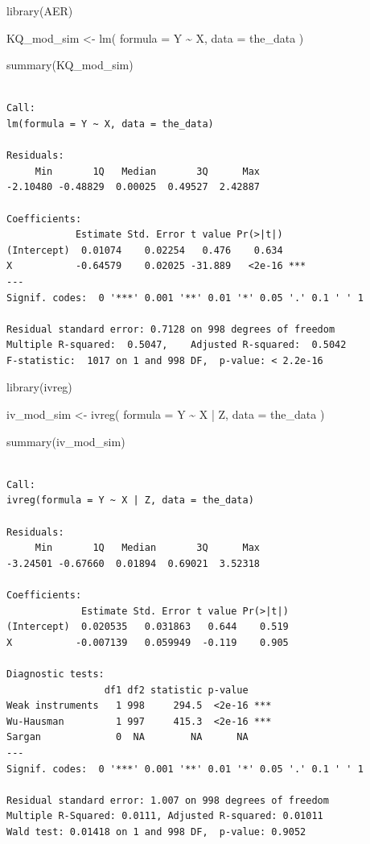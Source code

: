 \documentclass[
  a4paper,
  DIV=11,
  oneside]{scrreprt}
\newenvironment{Shaded}{\begin{snugshade}}{\end{snugshade}}
\newcommand{\AttributeTok}[1]{\textcolor[rgb]{0.40,0.45,0.13}{#1}}
\newcommand{\FunctionTok}[1]{\textcolor[rgb]{0.28,0.35,0.67}{#1}}
\newcommand{\NormalTok}[1]{\textcolor[rgb]{0.00,0.23,0.31}{#1}}
\newcommand{\OtherTok}[1]{\textcolor[rgb]{0.00,0.23,0.31}{#1}}
\newcommand{\SpecialCharTok}[1]{\textcolor[rgb]{0.37,0.37,0.37}{#1}}
\begin{document}
\begin{Shaded}
\begin{Highlighting}[]
\FunctionTok{library}\NormalTok{(AER)}

\NormalTok{KQ\_mod\_sim }\OtherTok{\textless{}{-}} \FunctionTok{lm}\NormalTok{(}
  \AttributeTok{formula =}\NormalTok{ Y }\SpecialCharTok{\textasciitilde{}}\NormalTok{ X,}
  \AttributeTok{data =}\NormalTok{ the\_data}
\NormalTok{)}

\FunctionTok{summary}\NormalTok{(KQ\_mod\_sim)}
\end{Highlighting}
\end{Shaded}

\begin{verbatim}

Call:
lm(formula = Y ~ X, data = the_data)

Residuals:
     Min       1Q   Median       3Q      Max 
-2.10480 -0.48829  0.00025  0.49527  2.42887 

Coefficients:
            Estimate Std. Error t value Pr(>|t|)    
(Intercept)  0.01074    0.02254   0.476    0.634    
X           -0.64579    0.02025 -31.889   <2e-16 ***
---
Signif. codes:  0 '***' 0.001 '**' 0.01 '*' 0.05 '.' 0.1 ' ' 1

Residual standard error: 0.7128 on 998 degrees of freedom
Multiple R-squared:  0.5047,    Adjusted R-squared:  0.5042 
F-statistic:  1017 on 1 and 998 DF,  p-value: < 2.2e-16
\end{verbatim}

\begin{Shaded}
\begin{Highlighting}[]
\FunctionTok{library}\NormalTok{(ivreg)}

\NormalTok{iv\_mod\_sim }\OtherTok{\textless{}{-}} \FunctionTok{ivreg}\NormalTok{(}
  \AttributeTok{formula =}\NormalTok{ Y }\SpecialCharTok{\textasciitilde{}}\NormalTok{ X }\SpecialCharTok{|}\NormalTok{ Z,}
  \AttributeTok{data =}\NormalTok{ the\_data}
\NormalTok{)}

\FunctionTok{summary}\NormalTok{(iv\_mod\_sim)}
\end{Highlighting}
\end{Shaded}

\begin{verbatim}

Call:
ivreg(formula = Y ~ X | Z, data = the_data)

Residuals:
     Min       1Q   Median       3Q      Max 
-3.24501 -0.67660  0.01894  0.69021  3.52318 

Coefficients:
             Estimate Std. Error t value Pr(>|t|)
(Intercept)  0.020535   0.031863   0.644    0.519
X           -0.007139   0.059949  -0.119    0.905

Diagnostic tests:
                 df1 df2 statistic p-value    
Weak instruments   1 998     294.5  <2e-16 ***
Wu-Hausman         1 997     415.3  <2e-16 ***
Sargan             0  NA        NA      NA    
---
Signif. codes:  0 '***' 0.001 '**' 0.01 '*' 0.05 '.' 0.1 ' ' 1

Residual standard error: 1.007 on 998 degrees of freedom
Multiple R-Squared: 0.0111, Adjusted R-squared: 0.01011 
Wald test: 0.01418 on 1 and 998 DF,  p-value: 0.9052 
\end{verbatim}
\end{document}
